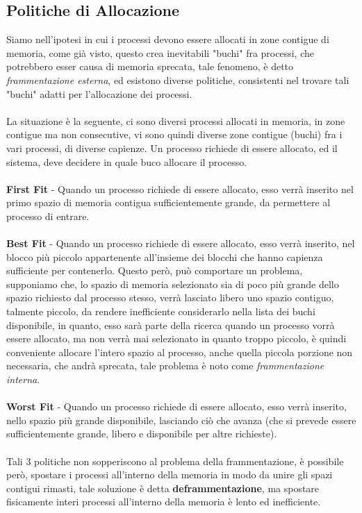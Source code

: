 \documentclass[12pt, letterpaper]{article}
\newcommand{\acc}{\\\hphantom{}\\}
\begin{document}
\subsection{Politiche di Allocazione}
Siamo nell'ipotesi in cui i processi devono essere allocati in zone contigue di memoria, come già visto, questo 
crea inevitabili "buchi" fra processi, che potrebbero esser causa di memoria sprecata, tale fenomeno, è detto \textit{frammentazione 
esterna}, ed esistono diverse politiche, consistenti nel trovare tali "buchi" adatti per l'allocazione dei processi.\acc
La situazione è la seguente, ci sono diversi processi allocati in memoria, in zone contigue ma non consecutive, vi sono quindi 
diverse zone contigue (buchi) fra i vari processi, di diverse capienze. Un processo richiede di essere allocato, 
ed il sistema, deve decidere in quale buco allocare il processo.\acc 
\textbf{First Fit }- Quando un processo richiede di essere allocato, esso verrà inserito nel primo spazio di memoria 
contigua sufficientemente grande, da permettere al processo di entrare.\acc
\textbf{Best Fit} -  Quando un processo richiede di essere allocato, esso verrà inserito, nel blocco 
più piccolo appartenente all'insieme dei blocchi che hanno capienza sufficiente per contenerlo. Questo però, può 
comportare un problema, supponiamo che, lo spazio di memoria selezionato sia di poco più 
grande dello spazio richiesto dal processo stesso, verrà lasciato libero uno spazio contiguo, talmente piccolo, 
da rendere inefficiente considerarlo nella lista dei buchi disponibile, in quanto, esso sarà parte della ricerca quando 
un processo vorrà essere allocato, ma non verrà mai selezionato in quanto troppo piccolo, è quindi conveniente 
allocare l'intero spazio al processo, anche quella piccola porzione non necessaria, che andrà sprecata, tale problema 
è noto come \textit{frammentazione interna}.\acc 
\textbf{Worst Fit} - Quando un processo richiede di essere allocato, esso verrà inserito, nello spazio 
più grande disponibile, lasciando ciò che avanza (che si prevede essere sufficientemente grande, libero e disponibile per altre richieste).\acc 
Tali 3 politiche non sopperiscono al problema della frammentazione, è possibile però, spostare i processi all'interno 
della memoria in modo da unire gli spazi contigui rimasti, tale soluzione è detta \textbf{deframmentazione}, ma spostare 
fisicamente interi processi all'interno della memoria è lento ed inefficiente.
\end{document}
